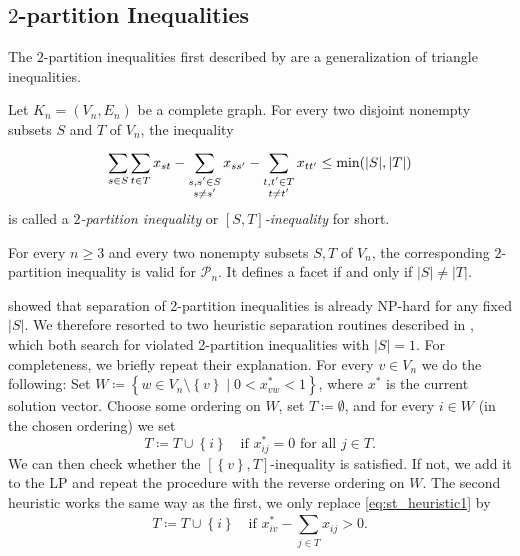 \subsection{\texorpdfstring{$2$-partition}{2-partition} Inequalities}\label{subsec:two_partition_separator}
The $2$-partition inequalities first described by \cite{grotschelFacetsCliquePartitioning1990} are a generalization of triangle inequalities.
\begin{definition}\label{def:2-partition_inequality}
	Let $K_{n} = (V_{n}, E_{n})$ be a complete graph.
	For every two disjoint nonempty subsets $S$ and $T$ of $V_{n}$, the inequality
	\begin{equation}\label{eq:2-partition_inequality}
		\sum_{s \in S}^{} \sum_{t \in T}^{} x_{st} - \sum_{\substack{s, s' \in S \\ s \neq s'}}^{} x_{ss'} - \sum_{\substack{t, t' \in T \\ t \neq t'}}^{} x_{tt'} \leq \operatorname{\text{min}}( \lvert S \rvert, \lvert T \rvert )
	\end{equation}
	is called a $2$\textit{-partition inequality} or \textit{$\left[ S,T \right]$-inequality} for short.
\end{definition}
\begin{theorem}
	For every $n \geq 3$ and every two nonempty subsets $S, T$ of $V_{n}$, the corresponding $2$-partition inequality is valid for $\mathscr{P}_{n}$.
	It defines a facet if and only if $\lvert  S \rvert \neq \lvert T \rvert$.
\end{theorem}
\cite{oostenCliquePartitioningProblem2001a} showed that separation of 2-partition inequalities is already \textsc{NP}-hard for any fixed $\lvert S \rvert$.
We therefore resorted to two heuristic separation routines described in \cite{grotschelFacetsCliquePartitioning1990}, which both search for violated 2-partition inequalities with $\lvert S \rvert = 1$.
For completeness, we briefly repeat their explanation.
For every $v \in V_{n}$ we do the following:
Set $W \coloneqq \left\{ w \in V_{n} \setminus \left\{ v \right\} \mid 0 < x_{vw}^{*} <1 \right\}$, where $x^{*}$ is the current solution vector.
Choose some ordering on $W$, set $T \coloneqq \emptyset$, and for every $i \in W$ (in the chosen ordering) we set
\begin{equation}\label{eq:st_heuristic1}
	T \coloneqq T \cup \left\{ i \right\} \quad \text{if } x^{*}_{ij}=0 \text{ for all } j \in T.
\end{equation}
We can then check whether the $\left[ \left\{ v \right\}, T \right]$-inequality is satisfied.
If not, we add it to the LP and repeat the procedure with the reverse ordering on $W$.
The second heuristic works the same way as the first, we only replace \cref{eq:st_heuristic1} by
\begin{equation}\label{eq:st_heuristic2}
	T \coloneqq T \cup \left\{ i \right\} \quad \text{if } x^{*}_{iv} - \sum_{j \in T}^{} x_{ij} > 0.
\end{equation}

